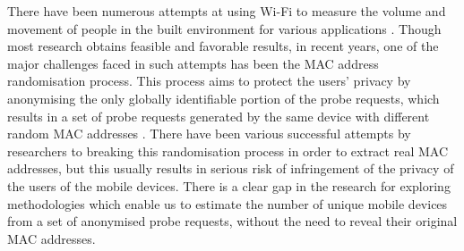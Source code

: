 There have been numerous attempts at using Wi-Fi to measure the volume and movement of people in the built environment for various applications \citep{zarim2006,sap2015,reki2007}.
Though most research obtains feasible and favorable results, in recent years, one of the major challenges faced in such attempts has been the MAC address randomisation process.
This process aims to protect the users’ privacy by anonymising the only globally identifiable portion of the probe requests, which results in a set of probe requests generated by the same device with different random MAC addresses \citep{green2008}.
There have been various successful attempts by researchers to breaking this randomisation process in order to extract real MAC addresses, \citep{martin2017} but this usually results in serious risk of infringement of the privacy of the users of the mobile devices.
There is a clear gap in the research for exploring methodologies which enable us to estimate the number of unique mobile devices from a set of anonymised probe requests, without the need to reveal their original MAC addresses.
